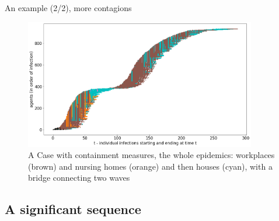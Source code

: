 \documentclass[8pt]{beamer}
\begin{document}
\begin{frame}{An example (1/2)}
\begin{figure}[H]
ections: workplaces (brown) and nursing homes (orange) strictly interweaving}
\label{workplacesNursingHomes}
\end{figure}
\end{frame}

\begin{frame}{An example (2/2), more contagions}

\begin{figure}[H]
\center
\includegraphics[width=0.9\textwidth]{with8a.png}%
\caption{A Case with containment measures, the whole epidemics: workplaces (brown) and nursing homes (orange) and then houses (cyan), with a bridge connecting two waves}
\label{workplacesNursingHomes}
\end{figure}


\end{frame}


\subsection{A significant sequence}
\end{document}
